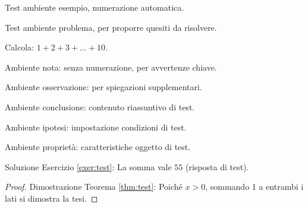 \documentclass[it]{../../elegantbook}
\begin{document}
\begin{definition}
\begin{theorem}
\begin{lemma}
\begin{corollary}
\begin{axiom}
\begin{postulate}
\begin{proposition}
\begin{example}\label{exa:test}
Test ambiente esempio, numerazione automatica.
\end{example}

\begin{problem}\label{probl:test}
Test ambiente problema, per proporre quesiti da risolvere.
\end{problem}

\begin{exercise}\label{exer:test}
Calcola: $1+2+3+\dots+10$.
\end{exercise}

\begin{note}
Ambiente nota: senza numerazione, per avvertenze chiave.
\end{note}

\begin{remark}
Ambiente osservazione: per spiegazioni supplementari.
\end{remark}

\begin{conclusion}
Ambiente conclusione: contenuto riassuntivo di test.
\end{conclusion}

\begin{assumption}
Ambiente ipotesi: impostazione condizioni di test.
\end{assumption}

\begin{property}
Ambiente proprietà: caratteristiche oggetto di test.
\end{property}

\begin{solution}
Soluzione Esercizio \ref{exer:test}: La somma vale $55$ (risposta di test).
\end{solution}

\begin{proof}
Dimostrazione Teorema \ref{thm:test}: Poiché $x>0$, sommando 1 a entrambi i lati si dimostra la tesi.
\end{proof}


\end{proposition}
\end{postulate}
\end{axiom}
\end{corollary}
\end{lemma}
\end{theorem}
\end{definition}
\end{document}
